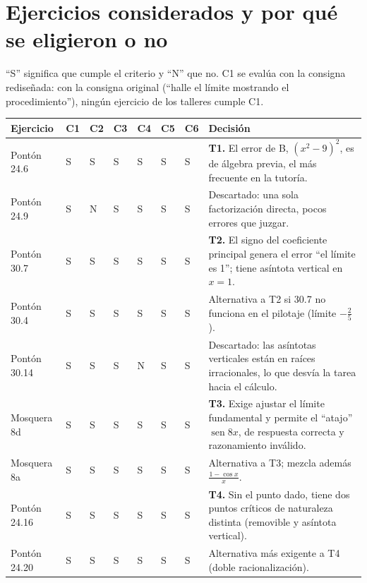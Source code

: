 \documentclass[11pt,letterpaper]{article}
\DeclareMathOperator{\seno}{sen}
\begin{document}
\section{Ejercicios considerados y por qué se eligieron o no}
\label{sec:cotejo}

``S'' significa que cumple el criterio y ``N'' que no. C1 se evalúa con la consigna rediseñada: con la consigna original (``halle el límite mostrando el procedimiento''), ningún ejercicio de los talleres cumple C1.

\begin{center}\footnotesize
\renewcommand{\arraystretch}{1.35}
\begin{tabularx}{\linewidth}{|p{2.5cm}|Y|Y|Y|Y|Y|Y|L|}
\hline
\textbf{Ejercicio} & \textbf{C1} & \textbf{C2} & \textbf{C3} & \textbf{C4} & \textbf{C5} & \textbf{C6} & \textbf{Decisión} \\ \hline
Pontón 24.6 & S & S & S & S & S & S & \textbf{T1.} El error de B, $(x^2-9)^2$, es de álgebra previa, el más frecuente en la tutoría. \\ \hline
Pontón 24.9 & S & N & S & S & S & S & Descartado: una sola factorización directa, pocos errores que juzgar. \\ \hline
Pontón 30.7 & S & S & S & S & S & S & \textbf{T2.} El signo del coeficiente principal genera el error ``el límite es 1''; tiene asíntota vertical en $x=1$. \\ \hline
Pontón 30.4 & S & S & S & S & S & S & Alternativa a T2 si 30.7 no funciona en el pilotaje (límite $-\frac25$). \\ \hline
Pontón 30.14 & S & S & S & N & S & S & Descartado: las asíntotas verticales están en raíces irracionales, lo que desvía la tarea hacia el cálculo. \\ \hline
Mosquera 8d & S & S & S & S & S & S & \textbf{T3.} Exige ajustar el límite fundamental y permite el ``atajo'' $\seno 8x$, de respuesta correcta y razonamiento inválido. \\ \hline
Mosquera 8a & S & S & S & S & S & S & Alternativa a T3; mezcla además $\frac{1-\cos x}{x}$. \\ \hline
Pontón 24.16 & S & S & S & S & S & S & \textbf{T4.} Sin el punto dado, tiene dos puntos críticos de naturaleza distinta (removible y asíntota vertical). \\ \hline
Pontón 24.20 & S & S & S & S & S & S & Alternativa más exigente a T4 (doble racionalización). \\ \hline

\end{tabularx}
\end{center}
\end{document}
